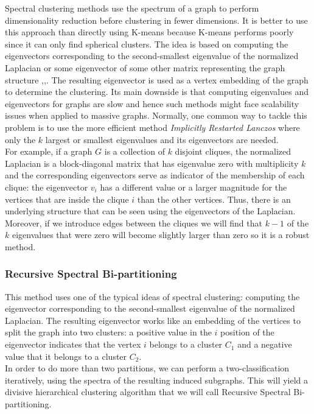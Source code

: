 \documentclass[11pt]{extarticle}
\begin{document}
Spectral clustering methods use the spectrum of a graph to perform dimensionality reduction before clustering in fewer dimensions. It is better to use this approach than directly using K-means because K-means performs poorly since it can only find spherical clusters. The idea is based on computing the eigenvectors corresponding to the second-smallest eigenvalue of the normalized Laplacian or some eigenvector of some other matrix representing the graph structure \cite{belkin2003laplacian},\cite{0711.0189},\cite{ng2002spectral}. The resulting eigenvector is used as a vertex embedding of the graph to determine the clustering. Its main downside is that computing eigenvalues and eigenvectors for graphs are slow and hence such methods might face scalability issues when applied to massive graphs. Normally, one common way to tackle this problem is to use the more efficient method \textit{Implicitly Restarted Lanczos} where only the $k$ largest or smallest eigenvalues and its eigenvectors are needed.\\

For example, if a graph $G$ is a collection of $k$ disjoint cliques, the normalized Laplacian is a block-diagonal matrix that has eigenvalue zero with multiplicity $k$ and the corresponding eigenvectors serve as indicator of the membership of each clique: the eigenvector $v_i$ has a different value or a larger magnitude for the vertices that are inside the clique $i$ than the other vertices. Thus, there is an underlying structure that can be seen using the eigenvectors of the Laplacian. Moreover, if we introduce edges between the cliques we will find that $k-1$ of the $k$ eigenvalues that were zero will become slightly larger than zero so it is a robust method. 

\subsubsection{Recursive Spectral Bi-partitioning}

This method uses one of the typical ideas of spectral clustering: computing the eigenvector corresponding to the second-smallest eigenvalue of the normalized Laplacian. The resulting eigenvector works like an embedding of the vertices to split the graph into two clusters: a positive value in the $i$ position of the eigenvector indicates that the vertex $i$ belongs to a cluster $C_1$ and a negative value that it belongs to a cluster $C_2$.\\

In order to do more than two partitions, we can perform a two-classification iteratively, using the spectra of the resulting induced subgraphs. This will yield a divisive hierarchical clustering algorithm that we will call Recursive Spectral Bi-partitioning.\\
\end{document}
